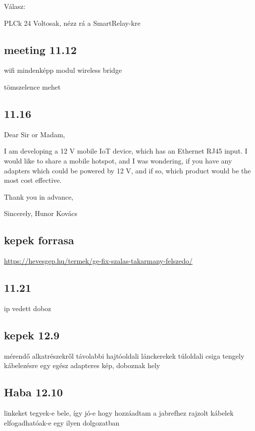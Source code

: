 \documentclass{article}
\begin{document}
	Válasz:
	
	PLCk 24 Voltosak, nézz rá a SmartRelay-kre
	
	\subsection{meeting 11.12}
	
	wifi mindenképp
	modul
	wireless bridge
		
	tömszelence mehet
	
	\subsection{11.16}
	
	Dear Sir or Madam,
	
	I am developing a 12 V mobile IoT device, which has an Ethernet RJ45 input. I would like to share a mobile hotspot, and I was wondering, if you have any adapters which could be powered by 12 V, and if so, which product would be the most cost effective.
	
	Thank you in advance,
	
	Sincerely,
	Hunor Kovács
		
	\subsection{kepek forrasa}
	\url{https://hevesgep.hu/termek/ge-fix-szalas-takarmany-felszedo/}
	
	\subsection{11.21}
	
	ip vedett doboz
	
	\subsection{kepek 12.9}
	
	mérendő alkatrészekről távolabbi
	hajtóoldali lánckerekek
	túloldali csiga tengely
	kábelezésre egy egész adapteres kép, doboznak hely
	
	\subsection{Haba 12.10}
	
	linkeket tegyek-e bele, így jó-e hogy hozzáadtam a jabrefhez
	rajzolt kábelek elfogadhatóak-e egy ilyen dolgozatban
	
\end{document}
